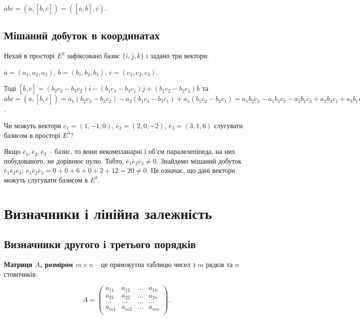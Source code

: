 \begin{claim}
	$\overline{a} \overline{b} \overline{c}
	= (\overline{a},[\overline{b},\overline{c}])
	=([\overline{a},\overline{b}],\overline{c}).$
\end{claim}

\subsection{Мішаний добуток в координатах}

Нехай в просторі $E^3$ зафіксовано базис $\{\overline{i}, \overline{j}, \overline{k}\}$ і задано три вектори:

$\overline{a} = (a_1, a_2, a_3)$, $\overline{b} = (b_1, b_2, b_3)$, $\overline{c} = (c_1, c_2, c_3)$.

Тоді $[\overline{b}, \overline{c}]
= (b_2c_3-b_3c_2)\overline{i} - (b_1c_3-b_3c_1)\overline{j} + (b_1c_2-b_2c_1)\overline{k}$
та $\overline{a}\overline{b}\overline{c} = (\overline{a},[\overline{b},\overline{c}]) = a_1(b_2c_3-b_3c_2) - a_2(b_1c_3-b_3c_1) + a_3(b_1c_2-b_2c_1) = 
a_1b_2c_3 - a_1b_3c_2 - a_2b_1c_3 + a_2b_3c_1 + a_3b_1c_2 - a_3b_2c_1$.

\begin{problem}
	Чи можуть вектори $\overline{e}_1=(1,-1,0)$, $\overline{e}_2=(2,0,-2)$, $\overline{e}_3=(3,1,6)$ слугувати базисом в просторі $E^3$?
\end{problem}
\begin{solution}
	Якщо $\overline{e}_1, \overline{e}_2, \overline{e}_3$ -- базис, то вони некомпланарні і об’єм
	паралелепіпеда, на них побудованого, не дорівнює нулю. Тобто, $\overline{e}_1\overline{e}_2\overline{e}_3 \neq 0$.
	Знайдемо мішаний добуток $\overline{e}_1\overline{e}_2\overline{e}_3$:
	$\overline{e}_1\overline{e}_2\overline{e}_3 = 0 + 0 + 6 + 0 + 2 + 12 = 20 \neq 0$.
	Це означає, що дані вектори можуть слугувати базисом в $E^3$.
\end{solution}

\section{Визначники і лінійна залежність}


\subsection{Визначники другого і третього порядків}

\begin{definition}[Матриця]
	\textbf{Матриця $A$, розміром $m \times n$} -- це прямокутна таблицю чисел з
	$m$ рядків та $n$ стовпчиків:
	
	$$A = \begin{pmatrix}
		a_{11}	& a_{12}	& ...	& a_{1n}  \\
		a_{21}	& a_{22}	& ...	& a_{2n}  \\
		...		& ...		& ...	& ...     \\
		a_{m1}	& a_{m2}	& ...	& a_{mn}  \\
	\end{pmatrix}.$$
\end{definition}

